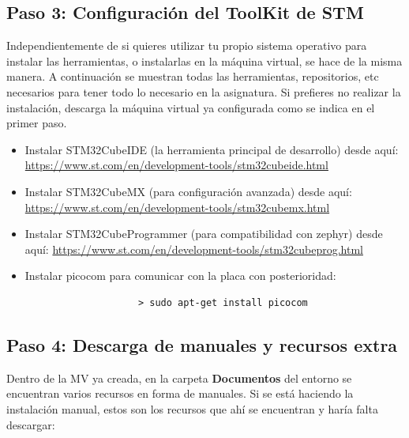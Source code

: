 \documentclass[../main.tex]{subfiles}
\begin{document}
    \subsection{Paso 3: Configuración del ToolKit de STM}\label{sub:toolkitsetup}
        Independientemente de si quieres utilizar tu propio sistema operativo para instalar las herramientas, o instalarlas en la máquina virtual, se hace de la misma manera. A continuación se muestran todas las herramientas, repositorios, etc necesarios para tener todo lo necesario en la asignatura. Si prefieres no realizar la instalación, descarga la máquina virtual ya configurada como se indica en el primer paso.

        \begin{itemize}
            \item Instalar STM32CubeIDE (la herramienta principal de desarrollo) desde aquí: \url{https://www.st.com/en/development-tools/stm32cubeide.html}
            \item Instalar STM32CubeMX (para configuración avanzada) desde aquí: \url{https://www.st.com/en/development-tools/stm32cubemx.html}
            \item Instalar STM32CubeProgrammer (para compatibilidad con zephyr) desde aquí: \url{https://www.st.com/en/development-tools/stm32cubeprog.html}
            \item Instalar picocom para comunicar con la placa con posterioridad:
                \begin{lstlisting}
                    > sudo apt-get install picocom
                \end{lstlisting}
        \end{itemize}

    \subsection{Paso 4: Descarga de manuales y recursos extra}
        Dentro de la MV ya creada, en la carpeta \textbf{Documentos} del entorno se encuentran varios recursos en forma de manuales. Si se está haciendo la instalación manual, estos son los recursos que ahí se encuentran y haría falta descargar:
\end{document}
